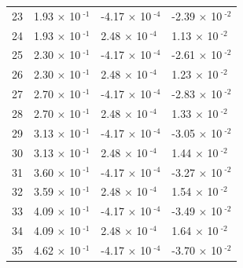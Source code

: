 \documentclass[a4paper,11pt]{article}
\begin{document}
\begin{center}
\begin{longtable}{|R{1.5cm}|R{2.5cm}|R{2.5cm}|R{2.5cm}|}
   23 &         1.93 $\times$ 10$^{\text{          -1}}$  &        -4.17 $\times$ 10$^{\text{          -4}}$  &        -2.39 $\times$ 10$^{\text{          -2}}$ \\ 
   24 &         1.93 $\times$ 10$^{\text{          -1}}$  &         2.48 $\times$ 10$^{\text{          -4}}$  &         1.13 $\times$ 10$^{\text{          -2}}$ \\ 
   25 &         2.30 $\times$ 10$^{\text{          -1}}$  &        -4.17 $\times$ 10$^{\text{          -4}}$  &        -2.61 $\times$ 10$^{\text{          -2}}$ \\ 
   26 &         2.30 $\times$ 10$^{\text{          -1}}$  &         2.48 $\times$ 10$^{\text{          -4}}$  &         1.23 $\times$ 10$^{\text{          -2}}$ \\ 
   27 &         2.70 $\times$ 10$^{\text{          -1}}$  &        -4.17 $\times$ 10$^{\text{          -4}}$  &        -2.83 $\times$ 10$^{\text{          -2}}$ \\ 
   28 &         2.70 $\times$ 10$^{\text{          -1}}$  &         2.48 $\times$ 10$^{\text{          -4}}$  &         1.33 $\times$ 10$^{\text{          -2}}$ \\ 
   29 &         3.13 $\times$ 10$^{\text{          -1}}$  &        -4.17 $\times$ 10$^{\text{          -4}}$  &        -3.05 $\times$ 10$^{\text{          -2}}$ \\ 
   30 &         3.13 $\times$ 10$^{\text{          -1}}$  &         2.48 $\times$ 10$^{\text{          -4}}$  &         1.44 $\times$ 10$^{\text{          -2}}$ \\ 
   31 &         3.60 $\times$ 10$^{\text{          -1}}$  &        -4.17 $\times$ 10$^{\text{          -4}}$  &        -3.27 $\times$ 10$^{\text{          -2}}$ \\ 
   32 &         3.59 $\times$ 10$^{\text{          -1}}$  &         2.48 $\times$ 10$^{\text{          -4}}$  &         1.54 $\times$ 10$^{\text{          -2}}$ \\ 
   33 &         4.09 $\times$ 10$^{\text{          -1}}$  &        -4.17 $\times$ 10$^{\text{          -4}}$  &        -3.49 $\times$ 10$^{\text{          -2}}$ \\ 
   34 &         4.09 $\times$ 10$^{\text{          -1}}$  &         2.48 $\times$ 10$^{\text{          -4}}$  &         1.64 $\times$ 10$^{\text{          -2}}$ \\ 
   35 &         4.62 $\times$ 10$^{\text{          -1}}$  &        -4.17 $\times$ 10$^{\text{          -4}}$  &        -3.70 $\times$ 10$^{\text{          -2}}$ \\ 

\end{longtable}
\end{center}
\end{document}
